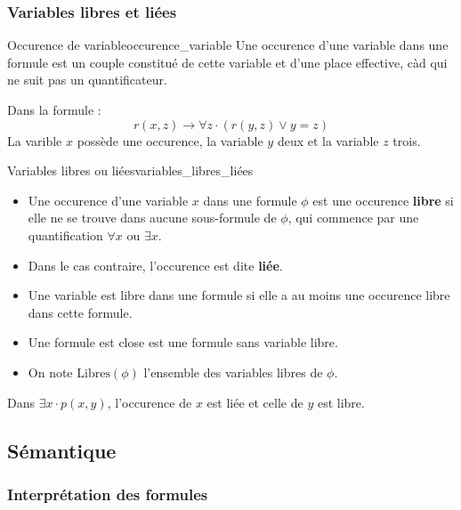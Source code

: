 \subsubsection{Variables libres et liées}
\label{subsubsec:variables_libres_liées}
\begin{definition}{Occurence de variable}{occurence_variable}
    Une occurence d'une variable dans une formule est un couple constitué de cette variable et d'une place effective, càd qui
    ne suit pas un quantificateur. 
\end{definition}
\begin{example}
    Dans la formule :
    \begin{equation*}
        r(x,z)\rightarrow\forall z\cdot (r(y,z)\vee y=z)
    \end{equation*}
    La varible $x$ possède une occurence, la variable $y$ deux et la variable $z$ trois.
\end{example}
\begin{definition}{Variables libres ou liées}{variables_libres_liées}
    \begin{itemize}[label=\textbullet]
        \item Une occurence d'une variable $x$ dans une formule $\phi$ est une occurence \textbf{libre} si elle ne se trouve 
        dans aucune sous-formule de $\phi$, qui commence par une quantification $\forall x$ ou $\exists x$.
        \item Dans le cas contraire, l'occurence est dite \textbf{liée}.
        \item Une variable est libre dans une formule si elle a au moins une occurence libre dans cette formule.
        \item Une formule est close est une formule sans variable libre.
        \item On note $\text{Libres}(\phi)$ l'ensemble des variables libres de $\phi$.
    \end{itemize}
\end{definition}
\begin{example}
    Dans $\exists x\cdot p(x,y)$, l'occurence de $x$ est liée et celle de $y$ est libre.
\end{example}



\subsection{Sémantique}
\label{subsec:sémantique}

\subsubsection{Interprétation des formules}
\label{subsubsec:interprétation_formules}

